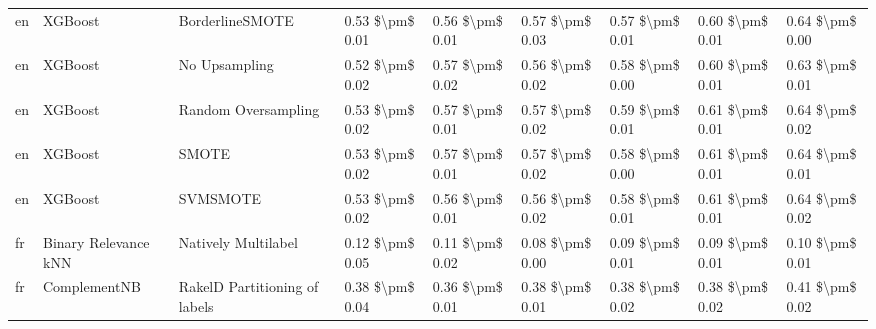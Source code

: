 \begin{tabular}{lllllllll}
      en &                         XGBoost &               BorderlineSMOTE & 0.53 \$\textbackslash pm\$ 0.01 &           0.56 \$\textbackslash pm\$ 0.01 &       0.57 \$\textbackslash pm\$ 0.03 &        0.57 \$\textbackslash pm\$ 0.01 &                         0.60 \$\textbackslash pm\$ 0.01 &     0.64 \$\textbackslash pm\$ 0.00 \\
      en &                         XGBoost &                 No Upsampling & 0.52 \$\textbackslash pm\$ 0.02 &           0.57 \$\textbackslash pm\$ 0.02 &       0.56 \$\textbackslash pm\$ 0.02 &        0.58 \$\textbackslash pm\$ 0.00 &                         0.60 \$\textbackslash pm\$ 0.01 &     0.63 \$\textbackslash pm\$ 0.01 \\
      en &                         XGBoost &           Random Oversampling & 0.53 \$\textbackslash pm\$ 0.02 &           0.57 \$\textbackslash pm\$ 0.01 &       0.57 \$\textbackslash pm\$ 0.02 &        0.59 \$\textbackslash pm\$ 0.01 &                         0.61 \$\textbackslash pm\$ 0.01 &     0.64 \$\textbackslash pm\$ 0.02 \\
      en &                         XGBoost &                         SMOTE & 0.53 \$\textbackslash pm\$ 0.02 &           0.57 \$\textbackslash pm\$ 0.01 &       0.57 \$\textbackslash pm\$ 0.02 &        0.58 \$\textbackslash pm\$ 0.00 &                         0.61 \$\textbackslash pm\$ 0.01 &     0.64 \$\textbackslash pm\$ 0.01 \\
      en &                         XGBoost &                      SVMSMOTE & 0.53 \$\textbackslash pm\$ 0.02 &           0.56 \$\textbackslash pm\$ 0.01 &       0.56 \$\textbackslash pm\$ 0.02 &        0.58 \$\textbackslash pm\$ 0.01 &                         0.61 \$\textbackslash pm\$ 0.01 &     0.64 \$\textbackslash pm\$ 0.02 \\
      fr &            Binary Relevance kNN &           Natively Multilabel & 0.12 \$\textbackslash pm\$ 0.05 &           0.11 \$\textbackslash pm\$ 0.02 &       0.08 \$\textbackslash pm\$ 0.00 &        0.09 \$\textbackslash pm\$ 0.01 &                         0.09 \$\textbackslash pm\$ 0.01 &     0.10 \$\textbackslash pm\$ 0.01 \\
      fr &                    ComplementNB & RakelD Partitioning of labels & 0.38 \$\textbackslash pm\$ 0.04 &           0.36 \$\textbackslash pm\$ 0.01 &       0.38 \$\textbackslash pm\$ 0.01 &        0.38 \$\textbackslash pm\$ 0.02 &                         0.38 \$\textbackslash pm\$ 0.02 &     0.41 \$\textbackslash pm\$ 0.02 \\

\end{tabular}
